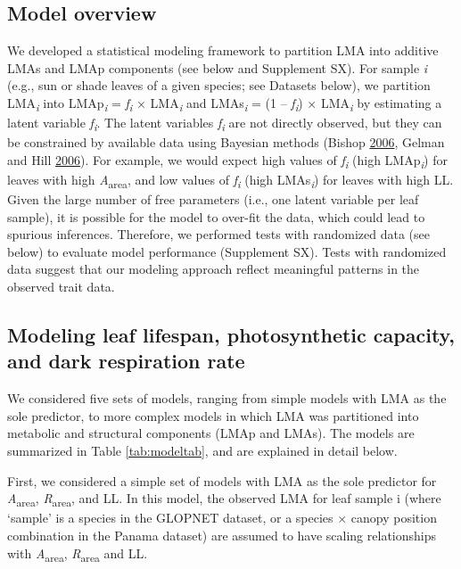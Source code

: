 \documentclass[
  12pt,
]{article}
\begin{document}
\hypertarget{model-overview}{%
\subsection{Model overview}\label{model-overview}}

We developed a statistical modeling framework to partition LMA into additive LMAs and LMAp components (see below and Supplement SX).
For sample \emph{i} (e.g., sun or shade leaves of a given species; see Datasets below), we partition LMA\textsubscript{\emph{i}} into LMAp\textsubscript{\emph{i}} = \emph{f\textsubscript{i}} × LMA\textsubscript{\emph{i}} and LMAs\textsubscript{\emph{i}} = (1 -- \emph{f\textsubscript{i}}) × LMA\textsubscript{\emph{i}} by estimating a latent variable \emph{f\textsubscript{i}}.
The latent variables \emph{f\textsubscript{i}} are not directly observed, but they can be constrained by available data using Bayesian methods (Bishop \protect\hyperlink{ref-Bishop2006}{2006}, Gelman and Hill \protect\hyperlink{ref-Gelman2006}{2006}).
For example, we would expect high values of \emph{f\textsubscript{i}} (high LMAp\textsubscript{\emph{i}}) for leaves with high \emph{A}\textsubscript{area}, and low values of \emph{f\textsubscript{i}} (high LMAs\textsubscript{\emph{i}}) for leaves with high LL.
Given the large number of free parameters (i.e., one latent variable per leaf sample), it is possible for the model to over-fit the data, which could lead to spurious inferences.
Therefore, we performed tests with randomized data (see below) to evaluate model performance (Supplement SX).
Tests with randomized data suggest that our modeling approach reflect meaningful patterns in the observed trait data.

\hypertarget{modeling-leaf-lifespan-photosynthetic-capacity-and-dark-respiration-rate}{%
\subsection{Modeling leaf lifespan, photosynthetic capacity, and dark respiration rate}\label{modeling-leaf-lifespan-photosynthetic-capacity-and-dark-respiration-rate}}

We considered five sets of models, ranging from simple models with LMA as the sole predictor, to more complex models in which LMA was partitioned into metabolic and structural components (LMAp and LMAs).
The models are summarized in Table \ref{tab:modeltab}, and are explained in detail below.

First, we considered a simple set of models with LMA as the sole predictor for \emph{A}\textsubscript{area}, \emph{R}\textsubscript{area}, and LL.
In this model, the observed LMA for leaf sample i (where `sample' is a species in the GLOPNET dataset, or a species \(\times\) canopy position combination in the Panama dataset) are assumed to have scaling relationships with \emph{A}\textsubscript{area}, \emph{R}\textsubscript{area} and LL.
\end{document}
